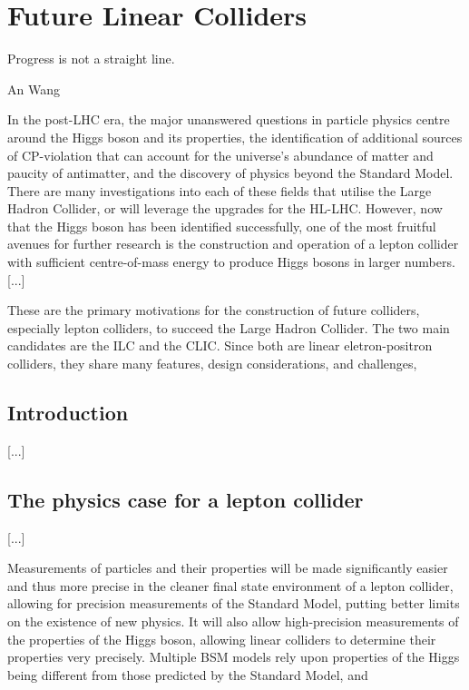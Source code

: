 \chapter{Future Linear Colliders}
\label{chapter:colliders}

\epigraph{Progress is not a straight line.}{An Wang}

In the post-LHC era, the major unanswered questions in particle physics centre around the Higgs boson and its properties, the identification of additional sources of CP-violation that can account for the universe's abundance of matter and paucity of antimatter, and the discovery of physics beyond the Standard Model. There are many investigations into each of these fields that utilise the Large Hadron Collider, or will leverage the upgrades for the \acrfull{HL-LHC}. However, now that the Higgs boson has been identified successfully, one of the most fruitful avenues for further research is the construction and operation of a lepton collider with sufficient centre-of-mass energy to produce Higgs bosons in larger numbers. [...]

These are the primary motivations for the construction of future colliders, especially lepton colliders, to succeed the Large Hadron Collider. The two main candidates are the \acrfull{ILC} and the \acrfull{CLIC}. Since both are linear eletron-positron colliders, they share many features, design considerations, and challenges, 


\section{Introduction}
[...]

\section{The physics case for a lepton collider}
[...]

Measurements of particles and their properties will be made significantly easier and thus more precise in the cleaner final state environment of a lepton collider, allowing for precision measurements of the Standard Model, putting better limits on the existence of new physics. It will also allow high-precision measurements of the properties of the Higgs boson, allowing linear colliders to determine their properties very precisely. Multiple BSM models rely upon properties of the Higgs being different from those predicted by the Standard Model, and 

